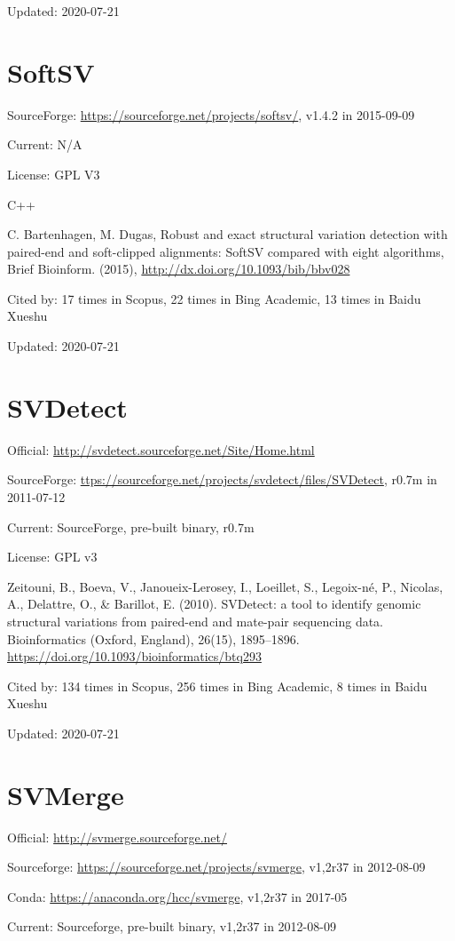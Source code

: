 \documentclass[]{article}
\newcommand{\cb}[3]{\par Cited by: {\color{blue}\Huge #1} times in Scopus, {\color{blue}\Huge #2} times in Bing Academic, {\color{blue}\Huge #3} times in Baidu Xueshu}
\begin{document}
Updated: 2020-07-21

\section{SoftSV}

SourceForge: \url{https://sourceforge.net/projects/softsv/}, v1.4.2 in 2015-09-09

Current: N/A

License: GPL V3

C++

C. Bartenhagen, M. Dugas, Robust and exact structural variation detection with paired-end and soft-clipped alignments: SoftSV compared with eight algorithms, Brief Bioinform. (2015), \url{http://dx.doi.org/10.1093/bib/bbv028}\cb{17}{22}{13}

Updated: 2020-07-21

\section{SVDetect}

Official: \url{http://svdetect.sourceforge.net/Site/Home.html}

SourceForge: \url{ttps://sourceforge.net/projects/svdetect/files/SVDetect}, r0.7m in 2011-07-12

Current: SourceForge, pre-built binary, r0.7m

License: GPL v3

Zeitouni, B., Boeva, V., Janoueix-Lerosey, I., Loeillet, S., Legoix-né, P., Nicolas, A., Delattre, O., \& Barillot, E. (2010). SVDetect: a tool to identify genomic structural variations from paired-end and mate-pair sequencing data. Bioinformatics (Oxford, England), 26(15), 1895–1896. \url{https://doi.org/10.1093/bioinformatics/btq293}\cb{134}{256}{8}

Updated: 2020-07-21

\section{SVMerge}

Official: \url{http://svmerge.sourceforge.net/}

Sourceforge: \url{https://sourceforge.net/projects/svmerge}, v1,2r37 in 2012-08-09

Conda: \url{https://anaconda.org/hcc/svmerge}, v1,2r37 in 2017-05

Current: Sourceforge, pre-built binary, v1,2r37 in 2012-08-09
\end{document}
